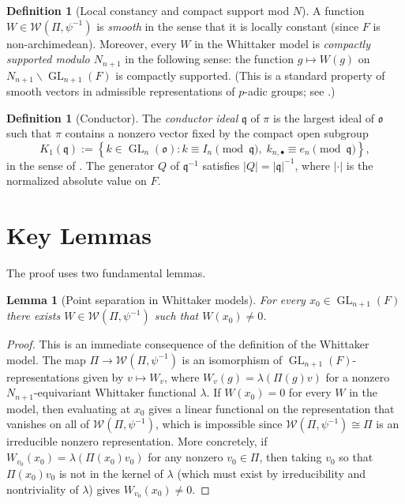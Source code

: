 \documentclass[12pt]{article}
\newtheorem{lemma}[theorem]{Lemma}
\theoremstyle{definition}
\newtheorem{definition}[theorem]{Definition}
\DeclareMathOperator{\GL}{GL}
\begin{document}
\begin{definition}[Local constancy and compact support mod $N$]
  A function $W \in \mathcal{W}(\Pi, \psi^{-1})$ is \emph{smooth} in the sense that it
  is locally constant (since $F$ is non-archimedean). Moreover, every $W$ in the Whittaker
  model is \emph{compactly supported modulo $N_{n+1}$} in the following sense: the function
  $g \mapsto W(g)$ on $N_{n+1} \backslash \GL_{n+1}(F)$ is compactly supported.
  (This is a standard property of smooth vectors in admissible representations of $p$-adic
  groups; see \cite[Section 3]{BZ76}.)
\end{definition}

\begin{definition}[Conductor]
  The \emph{conductor ideal} $\mathfrak{q}$ of $\pi$ is the largest ideal of $\mathfrak{o}$
  such that $\pi$ contains a nonzero vector fixed by the compact open subgroup
  \[
    K_1(\mathfrak{q}) :=
    \left\{ k \in \GL_n(\mathfrak{o}) :
      k \equiv I_n \pmod{\mathfrak{q}},\; k_{n,\bullet} \equiv e_n \pmod{\mathfrak{q}}
    \right\},
  \]
  in the sense of \cite[Section 5]{JPSS83}. The generator $Q$ of $\mathfrak{q}^{-1}$ satisfies
  $|Q| = |\mathfrak{q}|^{-1}$, where $|\cdot|$ is the normalized absolute value on $F$.
\end{definition}

\section*{Key Lemmas}

The proof uses two fundamental lemmas.

\begin{lemma}[Point separation in Whittaker models]
  \label{lem:separation}
  For every $x_0 \in \GL_{n+1}(F)$ there exists $W \in \mathcal{W}(\Pi, \psi^{-1})$
  such that $W(x_0) \neq 0$.
\end{lemma}

\begin{proof}
  This is an immediate consequence of the definition of the Whittaker model. The map
  $\Pi \to \mathcal{W}(\Pi, \psi^{-1})$ is an isomorphism of $\GL_{n+1}(F)$-representations
  given by $v \mapsto W_v$, where $W_v(g) = \lambda(\Pi(g)v)$ for a nonzero
  $N_{n+1}$-equivariant Whittaker functional $\lambda$.
  If $W(x_0) = 0$ for every $W$ in the model, then evaluating at $x_0$ gives a linear
  functional on the representation that vanishes on all of $\mathcal{W}(\Pi, \psi^{-1})$,
  which is impossible since $\mathcal{W}(\Pi, \psi^{-1}) \cong \Pi$ is an irreducible
  nonzero representation. More concretely, if $W_{v_0}(x_0) = \lambda(\Pi(x_0)v_0)$ for
  any nonzero $v_0 \in \Pi$, then taking $v_0$ so that $\Pi(x_0)v_0$ is not in the kernel
  of $\lambda$ (which must exist by irreducibility and nontriviality of $\lambda$) gives
  $W_{v_0}(x_0) \neq 0$.
\end{proof}
\end{document}
